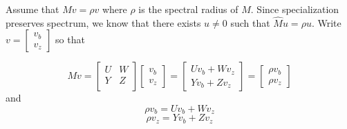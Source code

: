 \documentclass{article}
\begin{document}
Assume that $Mv = \rho v$ where $\rho$ is the spectral radius of $M$. Since specialization preserves spectrum, we know that there exists $u \neq 0$ such that $\hat{M}u = \rho u$. Write $v = \begin{bmatrix}
v_b \\ v_z
\end{bmatrix}$ so that 

\[Mv = \begin{bmatrix} U & W \\ Y & Z \\ \end{bmatrix} \begin{bmatrix} v_b \\ v_z \end{bmatrix}
=
\begin{bmatrix}Uv_b + Wv_z \\ Yv_b + Zv_z \end{bmatrix}
= 
\begin{bmatrix}\rho v_b \\ \rho v_z \end{bmatrix}
\]
and \begin{equation}
\rho v_b = Uv_b + Wv_z
\end{equation}
\begin{equation}
\rho v_z = Yv_b + Zv_z 
\end{equation}
\end{document}
